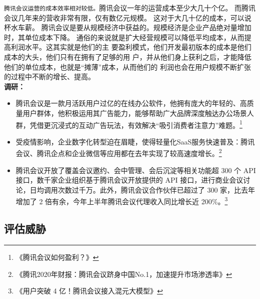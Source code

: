 \documentclass[a4paper,12pt]{article}
\begin{document}
\texttt{腾讯会议运营的成本效率相对较低。}腾讯会议一年的运营成本至少大几十个亿。 而腾讯会议几年来的营收非常有限，仅有数亿元规模。 这对于大几十亿的成本，可以说杯水车薪。
腾讯会议是要从规模经济中获益的。规模经济是企业产品绝对量增加时，其单位成本下降。
通俗的来说就是扩大经营规模可以降低平均成本，从而提高利润水平。这其实就是他们的主
要盈利模式，他们开发最初版本的成本是他们成本的大头，他们只有在拥有了足够的用
户，并从他们身上获利之后，才能降低他们的单位成本，也就是“摊薄”成本，从而他们的
利润也会在用户规模不断扩张的过程中不断的增长、提高。\\
\textbf{调研：}
\begin{itemize}
    \item 腾讯会议是一款月活跃用户过亿的在线办公软件，他拥有庞大的年轻的、高质量用户群体，他积极运用其广告能力，能够帮助广大品牌深度触达办公场景人群，凭借更沉浸式的互动广告玩法，有效解决“吸引消费者注意力”难题。\footnote{《腾讯会议如何盈利？》}
    \item 受疫情影响，企业数字化转型迫在眉睫，使得轻量化SaaS服务快速普及：腾讯会议、腾讯企点和企业微信等应用都在去年实现了较高速度增长。\footnote{《腾讯2020年财报：腾讯会议跻身中国No.1，加速提升市场渗透率》}
    \item 腾讯会议开放了覆盖会议邀约、会中管理、会后沉淀等相关功能超 300 个 API 接口，数千家企业组织基于腾讯会议开放提供的 API 接口，进行商业会议讨论，日均调用次数过千万。此外，腾讯会议合作伙伴已超过了 300 家，比去年增加了 2 倍有余，今年上半年腾讯会议代理收入同比增长近 200\%。\footnote{《用户突破 4 亿！腾讯会议接入混元大模型》}
\end{itemize}

    \subsection{评估威胁}\label{subsec:threat}
\end{document}
